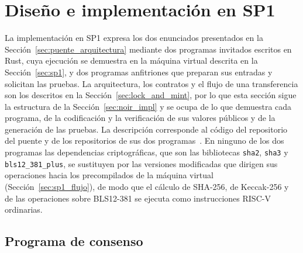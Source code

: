 \section{Diseño e implementación en SP1}
\label{sec:sp1_impl}

La implementación en SP1 expresa los dos enunciados presentados en la
Sección~\ref{sec:puente_arquitectura} mediante dos programas invitados escritos en Rust, cuya
ejecución se demuestra en la máquina virtual descrita en la Sección~\ref{sec:sp1}, y dos programas
anfitriones que preparan sus entradas y solicitan las pruebas. La arquitectura, los contratos y el
flujo de una transferencia son los descritos en la Sección~\ref{sec:lock_and_mint}, por lo que esta sección
sigue la estructura de la Sección~\ref{sec:noir_impl} y se ocupa de lo que demuestra cada programa,
de la codificación y la verificación de sus valores públicos y de la generación de las pruebas. La
descripción corresponde al código del repositorio del puente y de los repositorios de sus dos
programas~\cite{zkguaranibridgesp1, sp1synccommitteerepo, txinclusionsp1repo}. En ninguno de los
dos programas las dependencias criptográficas, que son las bibliotecas \texttt{sha2},
\texttt{sha3} y \texttt{bls12\_381\_plus}, se sustituyen por las versiones modificadas que dirigen
sus operaciones hacia los precompilados de la máquina virtual
(Sección~\ref{sec:sp1_flujo}), de modo que el cálculo de SHA-256, de Keccak-256 y de las
operaciones sobre BLS12-381 se ejecuta como instrucciones RISC-V ordinarias.

\subsection{Programa de consenso}
\label{sec:sp1_impl_consenso}

